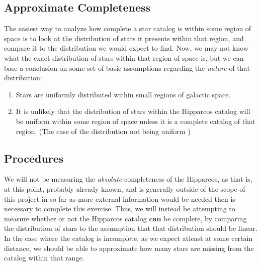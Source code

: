 \documentclass{business-covered} %
\begin{document}
		\subsection{Approximate Completeness}
		The easiest way to analyze how complete a star catalog is within some region of space is to look at the distribution of stars it presents within that region, and compare it to the distribution we would expect to find. Now, we may not know what the exact distribution of stars within that region of space is, but we can base a conclusion on some set of basic assumptions regarding the \textit{nature} of that distribution:
			\begin{enumerate}
				\item Stars are uniformly distributed within small regions of galactic 							space.
				\item It is unlikely that the distribution of stars within the Hipparcos catalog will be uniform within some region of space unless it is a complete catalog of that region. (The case of the distribution not being uniform )
			\end{enumerate}
	\subsection{Procedures}
		We will not be measuring the \textit{absolute} completeness of the Hipparcos, as that is, at this point, probably already known, and is generally outside of the scope of this project in so far as more external information would be needed then is necessary to complete this exercise. Thus, we will instead be attempting to measure whether or not the Hipparcos catalog \textbf{can} be complete, by comparing the distribution of stars to the assumption that that distribution should be linear. In the case where the catalog is incomplete, as we expect atleast at some certain distance, we should be able to approximate how many stars are missing from the catalog within that range.
		
\end{document}
